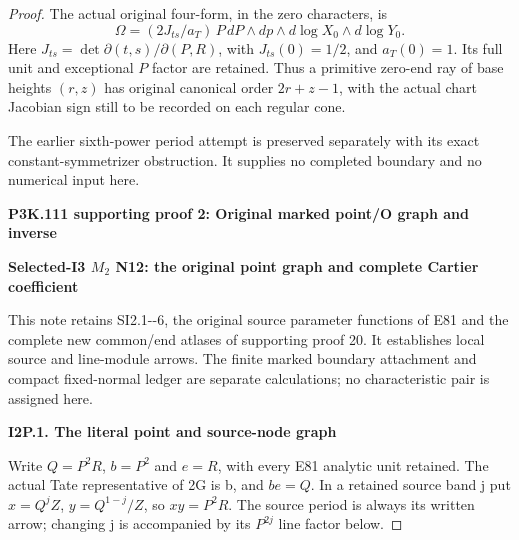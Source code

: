 \begin{proof}
The actual original four-form, in the zero characters, is
\[
 \Omega=(2J_{ts}/a_T)\,P\,dP\wedge dp\wedge
                        d\log X_0\wedge d\log Y_0.
 \tag{SI2.48}
\]
Here \(J_{ts}=\det\partial(t,s)/\partial(P,R)\), with \(J_{ts}(0)=1/2\),
and \(a_T(0)=1\). Its full unit and exceptional \(P\) factor are
retained. Thus a primitive zero-end ray of base heights \((r,z)\)
has original canonical order \(2r+z-1\), with the actual chart
Jacobian sign still to be recorded on each regular cone.

The earlier sixth-power period attempt is preserved separately
with its exact constant-symmetrizer obstruction. It supplies no
completed boundary and no numerical input here.




\par\bigskip\noindent\textbf{P3K.111 supporting proof 2: Original marked point/O graph and inverse}\par\nobreak
\par

\medskip\noindent\textbf{Selected-I3 \(M_{2}\) N12: the original point graph and complete Cartier coefficient}

\par\nobreak

This note retains SI2.1-\/-6, the original source parameter functions of
E81 and the complete new common/end atlases of supporting proof 20. It establishes
local source and line-module arrows. The finite marked boundary
attachment and compact fixed-normal ledger are separate calculations;
no characteristic pair is assigned here.

\par

\medskip\noindent\textbf{I2P.1. The literal point and source-node graph}

\par\nobreak

Write \(Q=P^{2} R\), \(b=P^{2}\) and \(e=R\), with every E81 analytic unit retained.
The actual Tate representative of 2G is b, and \(be=Q\). In a retained
source band j put \(x=Q^j Z\), \(y=Q^{1-j}/Z\), so \(xy=P^{2} R\).
The source period is always its written arrow; changing j is accompanied
by its \(P^{2j}\) line factor below.


\end{proof}
